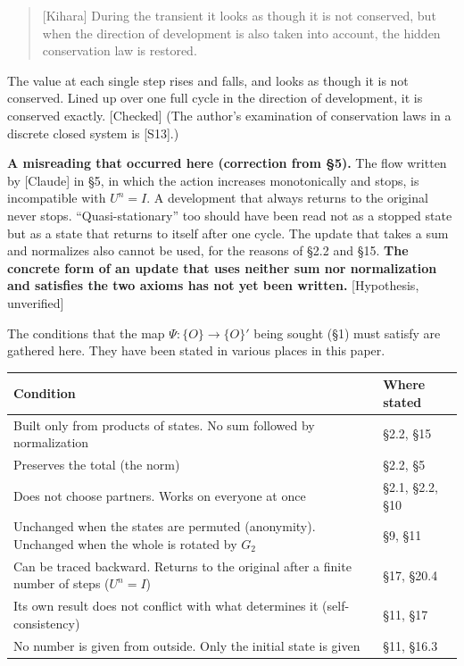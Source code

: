 \documentclass[
  a4paper,
]{article}
\newcounter{none} %
\begin{document}
\begin{quote}
{[}Kihara{]} During the transient it looks as though it is not
conserved, but when the direction of development is also taken into
account, the hidden conservation law is restored.
\end{quote}

The value at each single step rises and falls, and looks as though it is
not conserved. Lined up over one full cycle in the direction of
development, it is conserved exactly. {[}Checked{]} (The author's
examination of conservation laws in a discrete closed system is
{[}S13{]}.)

\textbf{A misreading that occurred here (correction from §5).} The flow
written by {[}Claude{]} in §5, in which the action increases
monotonically and stops, is incompatible with \(U^n = I\). A development
that always returns to the original never stops. ``Quasi-stationary''
too should have been read not as a stopped state but as a state that
returns to itself after one cycle. The update that takes a sum and
normalizes also cannot be used, for the reasons of §2.2 and §15.
\textbf{The concrete form of an update that uses neither sum nor
normalization and satisfies the two axioms has not yet been written.}
{[}Hypothesis, unverified{]}

The conditions that the map \(\Psi : \{O\} \to \{O\}'\) being sought
(§1) must satisfy are gathered here. They have been stated in various
places in this paper.

{\def\LTcaptype{none} %
\begin{longtable}[]{@{}
  >{\raggedright\arraybackslash}p{}
  >{\raggedright\arraybackslash}p{}@{}}
\toprule\noalign{}
\begin{minipage}[b]{\linewidth}\raggedright
Condition
\end{minipage} & \begin{minipage}[b]{\linewidth}\raggedright
Where stated
\end{minipage} \\
\midrule\noalign{}
\endhead
\bottomrule\noalign{}
\endlastfoot
Built only from products of states. No sum followed by normalization &
§2.2, §15 \\
Preserves the total (the norm) & §2.2, §5 \\
Does not choose partners. Works on everyone at once & §2.1, §2.2, §10 \\
Unchanged when the states are permuted (anonymity). Unchanged when the
whole is rotated by \(G_2\) & §9, §11 \\
Can be traced backward. Returns to the original after a finite number of
steps (\(U^n = I\)) & §17, §20.4 \\
Its own result does not conflict with what determines it
(self-consistency) & §11, §17 \\
No number is given from outside. Only the initial state is given & §11,
§16.3 \\
\end{longtable}
}
\end{document}
